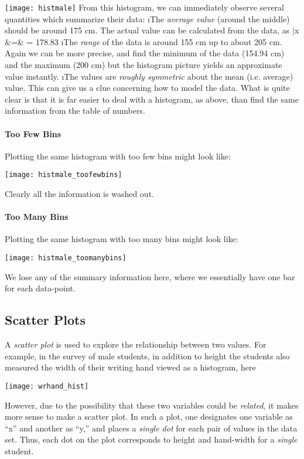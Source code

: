 \texttt{[image: histmale]}
From this histogram, we can immediately observe several quantities which summarize their data:
\be
\i The {\em average value} (around the middle) should be around 175 cm.  The actual value can be calculated from the data, as 
\beqn
\bar{x} &=&  = 178.83
\eeqn
\i The {\em range} of the data is around 155 cm up to about 205 cm.  Again we can be more precise, and find the minimum of the data (154.94 cm) and the maximum (200 cm) but the histogram picture yields an approximate value instantly.
\i The values are {\em roughly symmetric} about the mean (i.e. average) value.  This can give us a clue concerning how to model the data.
\ee
What is quite clear is that it is far easier to deal with a histogram, as above, than find the same information from the table of numbers.

\paragraph{Too Few Bins}

Plotting the same histogram with too few bins might look like:

\texttt{[image: histmale\_toofewbins]}

Clearly all the information is washed out.

\paragraph{Too Many Bins}

Plotting the same histogram with too many bins might look like:

\texttt{[image: histmale\_toomanybins]}

We lose any of the summary information here, where we essentially have one bar for each data-point.


\subsection{Scatter Plots}

A {\em scatter plot} is used to explore the relationship between two values.  For example, in the survey of male students, in addition to height the students also measured the width of their writing hand viewed as a histogram, here

\texttt{[image: wrhand\_hist]}

However, due to the possibility that these two variables could be {\em related}, it makes more sense to make a scatter plot.  In such a plot, one designates one variable as ``x'' and another as ``y,'' and places a {\em single dot} for each pair of values in the data set.  Thus, each dot on the plot corresponds to height and hand-width for a \emph{single} student. 

